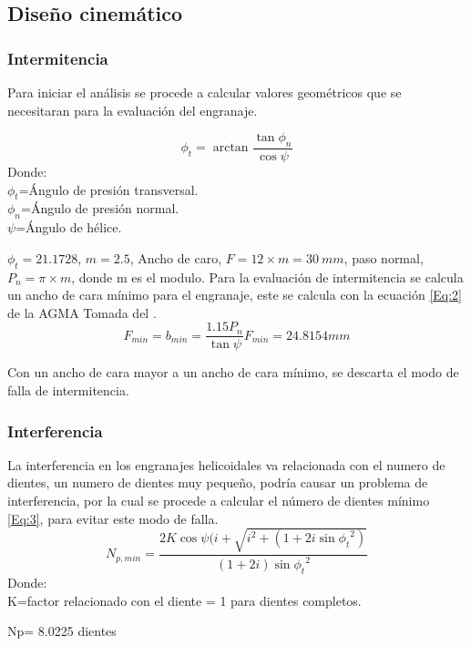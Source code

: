 \subsection*{Diseño cinemático}
\subsubsection*{Intermitencia}
Para iniciar el análisis se procede a calcular valores geométricos que se necesitaran para la evaluación del engranaje. 

\begin{equation}
 \phi_{t}=\arctan{\frac{\tan{\phi_{n}}}{\cos{\psi}}}
\label{Eq:1}    
\end{equation}
Donde:\\
$ \phi_{t}$=Ángulo de presión transversal.\\
$\phi_{n}$=Ángulo de presión normal.\\
$\psi$=Ángulo de hélice.

$\phi_t = 21.1728$, $m=2.5$,    Ancho de caro, $F = 12\times m = 30~mm$, paso normal, $P_n=\pi \times m$, donde m es el modulo.
Para la evaluación de intermitencia se calcula un ancho de cara mínimo para el engranaje, este se calcula con la ecuación \ref{Eq:2} de la AGMA Tomada  del \citep{shigley2011shigley}.
\begin{equation}
 F_{min}=b_{min}=\frac{1.15 P_{n}}{\tan{\psi}}
 F_{min}= 24.8154 mm
\label{Eq:2}    
\end{equation}


Con un ancho de cara mayor a un ancho de cara mínimo, se descarta el modo de falla de intermitencia.
\subsubsection*{Interferencia}
La interferencia en los engranajes helicoidales va relacionada con el numero de dientes, un numero de dientes muy pequeño, podría causar un problema de interferencia, por la cual se procede a calcular el número de dientes mínimo  \ref{Eq:3}, para evitar este modo de falla.
\begin{equation}
 N_{p,min}=\frac{2K \cos{\psi}(i+\sqrt{i^{2}+(1+2i\sin{\phi_{t}}^{2})}}{(1+2i)\sin{\phi_{t}}^{2}}
\label{Eq:3}    
\end{equation}
Donde:\\
K=factor relacionado con el diente = 1 para dientes completos.

\begin{center}
    Np= 8.0225 dientes    
\end{center}

